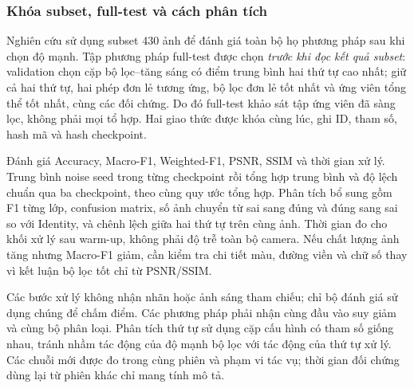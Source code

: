 \subsubsection{Khóa subset, full-test và cách phân tích}
Nghiên cứu sử dụng subset 430 ảnh để đánh giá toàn bộ họ phương pháp sau khi chọn độ mạnh. Tập phương pháp full-test được chọn \textit{trước khi đọc kết quả subset}: validation chọn cặp bộ lọc--tăng sáng có điểm trung bình hai thứ tự cao nhất; giữ cả hai thứ tự, hai phép đơn lẻ tương ứng, bộ lọc đơn lẻ tốt nhất và ứng viên tổng thể tốt nhất, cùng các đối chứng. Do đó full-test khảo sát tập ứng viên đã sàng lọc, không phải mọi tổ hợp. Hai giao thức được khóa cùng lúc, ghi ID, tham số, hash mã và hash checkpoint.

Đánh giá Accuracy, Macro-F1, Weighted-F1, PSNR, SSIM và thời gian xử lý. Trung bình noise seed trong từng checkpoint rồi tổng hợp trung bình và độ lệch chuẩn qua ba checkpoint, theo cùng quy ước tổng hợp. Phân tích bổ sung gồm F1 từng lớp, confusion matrix, số ảnh chuyển từ sai sang đúng và đúng sang sai so với Identity, và chênh lệch giữa hai thứ tự trên cùng ảnh. Thời gian đo cho khối xử lý sau warm-up, không phải độ trễ toàn bộ camera. Nếu chất lượng ảnh tăng nhưng Macro-F1 giảm, cần kiểm tra chi tiết màu, đường viền và chữ số thay vì kết luận bộ lọc tốt chỉ từ PSNR/SSIM.

Các bước xử lý không nhận nhãn hoặc ảnh sáng tham chiếu; chỉ bộ đánh giá sử dụng chúng để chấm điểm. Các phương pháp phải nhận cùng đầu vào suy giảm và cùng bộ phân loại. Phân tích thứ tự sử dụng cặp cấu hình có tham số giống nhau, tránh nhầm tác động của độ mạnh bộ lọc với tác động của thứ tự xử lý. Các chuỗi mới được đo trong cùng phiên và phạm vi tác vụ; thời gian đối chứng dùng lại từ phiên khác chỉ mang tính mô tả.
